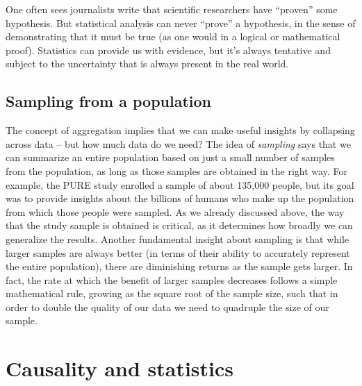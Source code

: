 \documentclass[12pt,]{book}
\theoremstyle{definition}
\theoremstyle{definition}
\theoremstyle{definition}
\theoremstyle{remark}
\begin{document}
One often sees journalists write that scientific researchers have ``proven'' some hypothesis. But statistical analysis can never ``prove'' a hypothesis, in the sense of demonstrating that it must be true (as one would in a logical or mathematical proof). Statistics can provide us with evidence, but it's always tentative and subject to the uncertainty that is always present in the real world.

\hypertarget{sampling-from-a-population}{%
\subsection{Sampling from a population}\label{sampling-from-a-population}}

The concept of aggregation implies that we can make useful insights by collapsing across data -- but how much data do we need? The idea of \emph{sampling} says that we can summarize an entire population based on just a small number of samples from the population, as long as those samples are obtained in the right way. For example, the PURE study enrolled a sample of about 135,000 people, but its goal was to provide insights about the billions of humans who make up the population from which those people were sampled. As we already discussed above, the way that the study sample is obtained is critical, as it determines how broadly we can generalize the results. Another fundamental insight about sampling is that while larger samples are always better (in terms of their ability to accurately represent the entire population), there are diminishing returns as the sample gets larger. In fact, the rate at which the benefit of larger samples decreases follows a simple mathematical rule, growing as the square root of the sample size, such that in order to double the quality of our data we need to quadruple the size of our sample.

\hypertarget{causality-and-statistics}{%
\section{Causality and statistics}\label{causality-and-statistics}}
\end{document}

